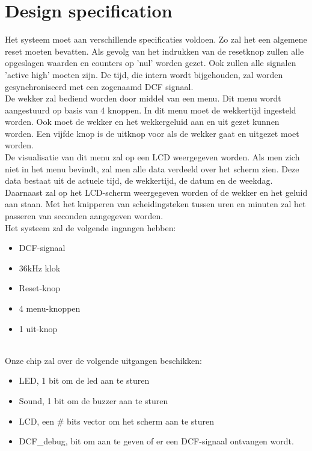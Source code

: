 \chapter{Design specification}
Het systeem moet aan verschillende specificaties voldoen. Zo zal het een algemene reset moeten bevatten. Als gevolg van het indrukken van de resetknop zullen alle opgeslagen waarden en counters op 'nul' worden gezet. Ook zullen alle signalen 'active high' moeten zijn. De tijd, die intern wordt bijgehouden, zal worden gesynchroniseerd met een zogenaamd DCF signaal.\\
De wekker zal bediend worden door middel van een menu. Dit menu wordt aangestuurd op basis van 4 knoppen. In dit menu moet de wekkertijd ingesteld worden. Ook moet de wekker en het wekkergeluid aan en uit gezet kunnen worden. Een vijfde knop is de uitknop voor als de wekker gaat en uitgezet moet worden.\\
De visualisatie van dit menu zal op een LCD weergegeven worden. Als men zich niet in het menu bevindt, zal men alle data verdeeld over het scherm zien. Deze data bestaat uit de actuele tijd, de wekkertijd, de datum en de weekdag. Daarnaast zal op het LCD-scherm weergegeven worden of de wekker en het geluid aan staan. Met het knipperen van scheidingsteken tussen uren en minuten zal het passeren van seconden aangegeven worden.\\
Het systeem zal de volgende ingangen hebben:
\begin{itemize}[nolistsep]
\item	DCF-signaal
\item	36kHz klok
\item	Reset-knop
\item	4 menu-knoppen
\item 1 uit-knop
\end{itemize}

\noindent
\\
Onze chip zal over de volgende uitgangen beschikken:
\begin{itemize}[nolistsep]
\item	LED, 1 bit om de led aan te sturen
\item	Sound, 1 bit om de buzzer aan te sturen
\item	LCD, een \# bits vector om het scherm aan te sturen
\item	DCF\_debug, bit om aan te geven of er een DCF-signaal ontvangen wordt.
\end{itemize}
